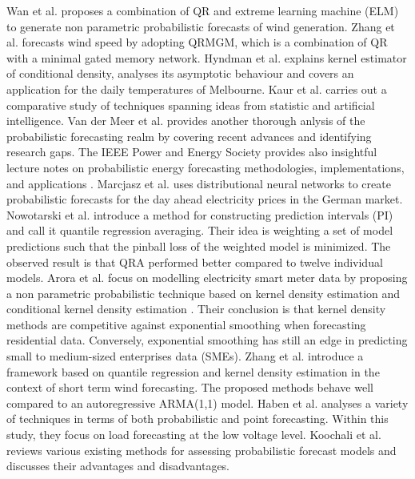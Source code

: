 Wan et al. \cite{wan2016direct} proposes a combination of QR and extreme learning machine (ELM) to generate non parametric probabilistic forecasts of wind generation.
Zhang et al. \cite{zhang2019wind} forecasts wind speed by adopting QRMGM, which is a combination of QR with a minimal gated memory network.
Hyndman et al. \cite{hyndman1996estimating} explains kernel estimator of conditional density, analyses its asymptotic behaviour and covers an application for the daily temperatures of Melbourne.
Kaur et al. \cite{kaur2022energy} carries out a comparative study of techniques spanning ideas from statistic and artificial intelligence.
Van der Meer et al. \cite{van2018review} provides another thorough anlysis of the probabilistic forecasting realm by covering recent advances and identifying research gaps.
The IEEE Power and Energy Society provides also insightful lecture notes on probabilistic energy forecasting methodologies,
implementations, and applications .
Marcjasz et al. \cite{probablistic_electricity_forecast2} uses distributional neural networks to create probabilistic forecasts for the day ahead electricity prices in the German market.
Nowotarski et al. \cite{nowotarski2015computing} introduce a method for constructing prediction intervals (PI) and call it quantile regression averaging. Their idea is weighting a set of model predictions such that the pinball loss of the weighted model is minimized. The observed result is that QRA performed better compared to twelve individual models.
Arora et al. \cite{arora2016forecasting} focus on modelling electricity smart meter data by proposing a non parametric probabilistic technique based on kernel density estimation and conditional kernel density estimation \cite{rosenblatt1969conditional, hyndman1996estimating}. Their conclusion is that kernel density methods are competitive against exponential smoothing when forecasting residential data. Conversely, exponential smoothing has still an edge in predicting small to medium-sized enterprises data (SMEs).
Zhang et al. \cite{zhang2020probability} introduce a framework based on quantile regression and kernel density estimation in the context of short term wind forecasting. The proposed methods behave well compared to an autoregressive ARMA(1,1) model.
Haben et al. \cite{haben2018short} analyses a variety of techniques in terms of both probabilistic and point forecasting. Within this study, they focus on load forecasting at the low voltage level.
Koochali et al. \cite{koochali2022random} reviews various existing methods for assessing probabilistic forecast models and discusses their advantages and disadvantages.
